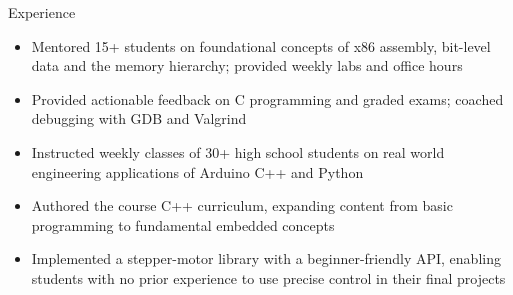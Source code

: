 \documentclass{resume}
\begin{document}
\begin{experienceSection}{Experience}
\begin{itemize}
		\vspace{-0.2em}
		\itemsep -6pt
		\item Mentored 15+ students on foundational concepts of x86 assembly, bit-level data and the memory hierarchy; provided weekly labs and office hours
		\item Provided actionable feedback on C programming and graded exams; coached debugging with GDB and Valgrind
	\end{itemize}
	\experienceItem[
		company={Rice ELITE Tech Camp},
		location={Houston, TX},
		position={Robotics Programming Instructor},
		duration={May 2025 – July 2025}
	]
	\begin{itemize}
		\vspace{-0.2em}
		\itemsep -6pt
		\item Instructed weekly classes of 30+ high school students on real world engineering applications of Arduino C++ and Python
		\item Authored the course C++ curriculum, expanding content from basic programming to fundamental embedded concepts
		\item Implemented a stepper-motor library with a beginner-friendly API, enabling students with no prior experience to use precise control in their final projects
	\end{itemize}
\end{experienceSection}
\end{document}
